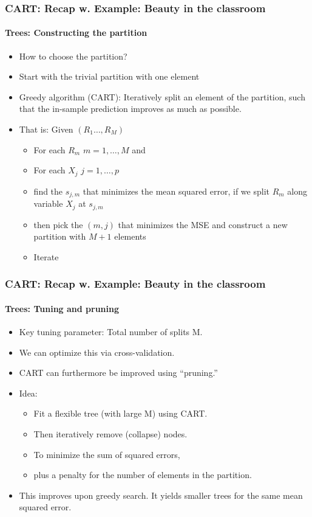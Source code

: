 \documentclass[
  shownotes,
  xcolor={svgnames},
  hyperref={colorlinks,citecolor=DarkBlue,linkcolor=DarkRed,urlcolor=DarkBlue}
  , aspectratio=169]{beamer}
\begin{document}
\begin{frame}[fragile]
\frametitle{CART: Recap w. Example: Beauty in the classroom}
\framesubtitle{Trees: Constructing the partition}


\begin{itemize}
 \item How to choose the partition?
 \item Start with the trivial partition with one element
 \item  Greedy algorithm (CART): Iteratively split an element of the partition, such that the in-sample prediction improves as much as possible.
 \item That is: Given $(R_1\dots,R_M)$
 \begin{itemize}
  \item For each $R_m$ $m=1,\dots,M$ and
  \item For each $X_j$ $j=1,\dots,p$
  \item find the $s_{j,m}$ that minimizes the mean squared error, if we split $R_m$ along variable $X_j$ at $s_{j,m}$
  \item then pick the $(m,j)$ that minimizes the MSE and construct a new partition with $M+1$ elements
  \item Iterate
 \end{itemize}
 
\end{itemize}
\end{frame}

\begin{frame}[fragile]
\frametitle{CART: Recap w. Example: Beauty in the classroom}
\framesubtitle{Trees: Tuning and pruning}

\begin{itemize}
\item Key tuning parameter: Total number of splits M.
\item We can optimize this via cross-validation.
\item CART can furthermore be improved using “pruning.”
\item Idea:
\begin{itemize}
\item Fit a flexible tree (with large M) using CART.
\item Then iteratively remove (collapse) nodes.
\item To minimize the sum of squared errors,
\item plus a penalty for the number of elements in the partition.
\end{itemize}

\item This improves upon greedy search. It yields smaller trees for the same mean squared error.
\end{itemize}

\end{frame}
\end{document}
